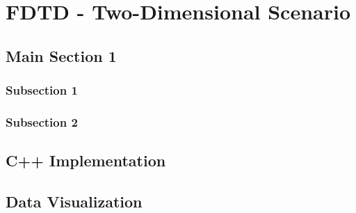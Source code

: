 
\chapter{FDTD - Two-Dimensional Scenario} %

\label{Chapter3} %


\section{Main Section 1}

\subsection{Subsection 1}

\subsection{Subsection 2}

\section{C++ Implementation}

\section{Data Visualization}

